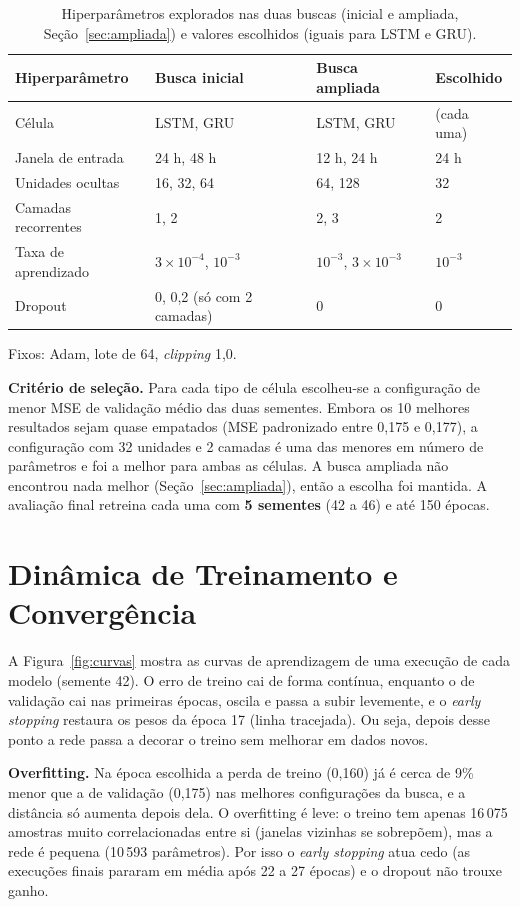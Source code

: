 \documentclass[11pt,a4paper]{article}
\begin{document}
\begin{table}[ht]
\centering
\small
\caption{Hiperparâmetros explorados nas duas buscas (inicial e ampliada, Seção~\ref{sec:ampliada}) e valores escolhidos (iguais para LSTM e GRU).}
\label{tab:hiper}
\begin{tabularx}{\textwidth}{lXXl}
\toprule
\textbf{Hiperparâmetro} & \textbf{Busca inicial} & \textbf{Busca ampliada} & \textbf{Escolhido} \\
\midrule
Célula & LSTM, GRU & LSTM, GRU & (cada uma) \\
Janela de entrada & 24 h, 48 h & 12 h, 24 h & 24 h \\
Unidades ocultas & 16, 32, 64 & 64, 128 & 32 \\
Camadas recorrentes & 1, 2 & 2, 3 & 2 \\
Taxa de aprendizado & $3\times10^{-4}$, $10^{-3}$ & $10^{-3}$, $3\times10^{-3}$ & $10^{-3}$ \\
Dropout & 0, 0,2 (só com 2 camadas) & 0 & 0 \\
\bottomrule
\end{tabularx}
\smallskip

\footnotesize Fixos: Adam, lote de 64, \emph{clipping} 1,0.
\end{table}

\textbf{Critério de seleção.} Para cada tipo de célula escolheu-se a configuração de menor MSE de validação médio das duas sementes. Embora os 10 melhores resultados sejam quase empatados (MSE padronizado entre 0,175 e 0,177), a configuração com 32 unidades e 2 camadas é uma das menores em número de parâmetros e foi a melhor para ambas as células. A busca ampliada não encontrou nada melhor (Seção~\ref{sec:ampliada}), então a escolha foi mantida. A avaliação final retreina cada uma com \textbf{5 sementes} (42 a 46) e até 150 épocas.

\section{Dinâmica de Treinamento e Convergência}
A Figura~\ref{fig:curvas} mostra as curvas de aprendizagem de uma execução de cada modelo (semente 42). O erro de treino cai de forma contínua, enquanto o de validação cai nas primeiras épocas, oscila e passa a subir levemente, e o \emph{early stopping} restaura os pesos da época 17 (linha tracejada). Ou seja, depois desse ponto a rede passa a decorar o treino sem melhorar em dados novos.

\textbf{Overfitting.} Na época escolhida a perda de treino (0,160) já é cerca de 9\% menor que a de validação (0,175) nas melhores configurações da busca, e a distância só aumenta depois dela. O overfitting é leve: o treino tem apenas 16\,075 amostras muito correlacionadas entre si (janelas vizinhas se sobrepõem), mas a rede é pequena (10\,593 parâmetros). Por isso o \emph{early stopping} atua cedo (as execuções finais pararam em média após 22 a 27 épocas) e o dropout não trouxe ganho.
\end{document}
